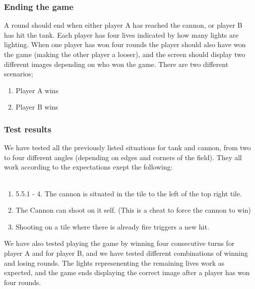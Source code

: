 \subsubsection{Ending the game}
A round should end when either player A has reached the cannon, or player B has hit the tank.
Each player has four lives indicated by how many lights are lighting. When one player has won
four rounds the player should also have won the game (making the other player a looser),
and the screen should display two different images depending on who won the game. There are
two different scenarios;
\begin{enumerate}
  \item Player A wins
  \item Player B wins
\end{enumerate}

\subsubsection{Test results}
We have tested all the previously listed situations for tank and cannon, from two to four
different angles (depending on edges and corners of the field). They all work
according to the expectations exept the following: \\
\\
\begin{enumerate}
  \item 5.5.1 - 4. The cannon is situated in the tile to the left of the top right tile.
  \item The Cannon can shoot on it self. (This is a cheat to force the cannon to win)
  \item Shooting on a tile where there is already fire triggers a new hit.
\end{enumerate}

We have also tested playing the game by winning four consecutive turns for player A and for
player B, and we have tested different combinations of winning and losing rounds.
The lights represenenting the remaining lives work as expected, and the game ends displaying
the correct image after a player has won four rounds.
